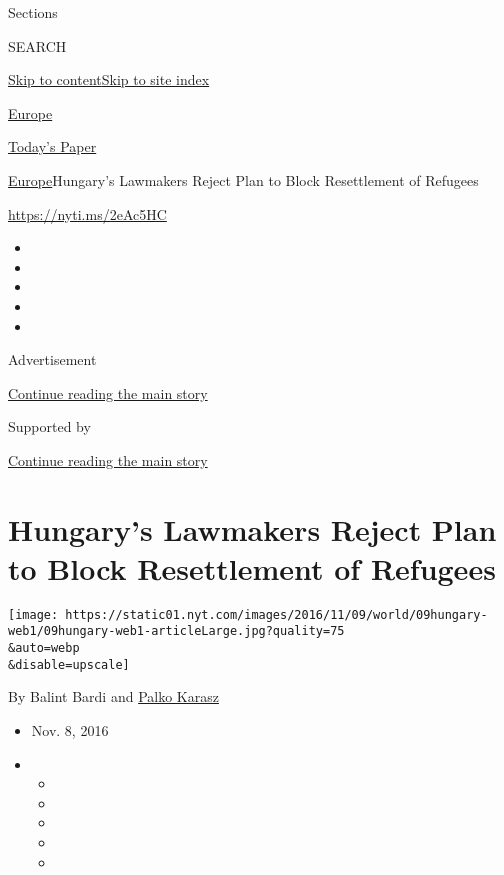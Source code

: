 Sections

SEARCH

\protect\hyperlink{site-content}{Skip to
content}\protect\hyperlink{site-index}{Skip to site index}

\href{https://www.nytimes.com/section/world/europe}{Europe}

\href{https://myaccount.nytimes.com/auth/login?response_type=cookie\&client_id=vi}{}

\href{https://www.nytimes.com/section/todayspaper}{Today's Paper}

\href{/section/world/europe}{Europe}\textbar{}Hungary's Lawmakers Reject
Plan to Block Resettlement of Refugees

\url{https://nyti.ms/2eAc5HC}

\begin{itemize}
\item
\item
\item
\item
\item
\end{itemize}

Advertisement

\protect\hyperlink{after-top}{Continue reading the main story}

Supported by

\protect\hyperlink{after-sponsor}{Continue reading the main story}

\hypertarget{hungarys-lawmakers-reject-plan-to-block-resettlement-of-refugees}{%
\section{Hungary's Lawmakers Reject Plan to Block Resettlement of
Refugees}\label{hungarys-lawmakers-reject-plan-to-block-resettlement-of-refugees}}

\texttt{[image: https://static01.nyt.com/images/2016/11/09/world/09hungary-web1/09hungary-web1-articleLarge.jpg?quality=75\\\&auto=webp\\\&disable=upscale]}

By Balint Bardi and \href{https://www.nytimes.com/by/palko-karasz}{Palko
Karasz}

\begin{itemize}
\item
  Nov. 8, 2016
\item
  \begin{itemize}
  \item
  \item
  \item
  \item
  \item
  \end{itemize}
\end{itemize}

